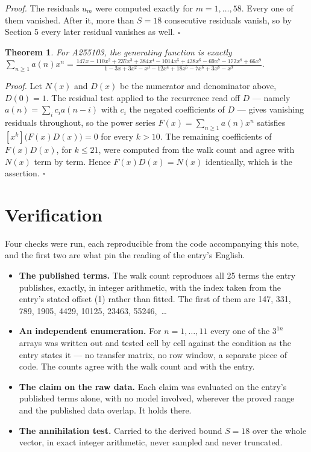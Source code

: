 \documentclass[11pt]{article}
\newtheorem{theorem}{Theorem}
\theoremstyle{definition}
\begin{document}
{\itshape Proof.} The residuals $u_m$ were computed exactly for $m = 1,\dots,58$. Every one of them vanished. After it, more than $S = 18$ consecutive residuals vanish, so by Section 5 every later residual vanishes as well. $\square$

\begin{theorem} For A255103, the generating function is exactly $\sum_{n\ge 1} a(n)x^n = \frac{147x - 110x^{2} + 237x^{3} + 384x^{4} - 1014x^{5} + 438x^{6} - 69x^{7} - 172x^{8} + 66x^{9}}{1 - 3x + 3x^{2} - x^{3} - 12x^{4} + 18x^{5} - 7x^{6} + 3x^{8} - x^{9}}$.\end{theorem}

{\itshape Proof.} Let $N(x)$ and $D(x)$ be the numerator and denominator above, $D(0)=1$. The residual test applied to the recurrence read off $D$ --- namely $a(n) = \sum_i c_i a(n-i)$ with $c_i$ the negated coefficients of $D$ --- gives vanishing residuals throughout, so the power series $F(x)=\sum_{n\ge 1}a(n)x^n$ satisfies $[x^k]\bigl(F(x)D(x)\bigr) = 0$ for every $k > 10$. The remaining coefficients of $F(x)D(x)$, for $k \le 21$, were computed from the walk count and agree with $N(x)$ term by term. Hence $F(x)D(x) = N(x)$ identically, which is the assertion. $\square$

\section{Verification}

Four checks were run, each reproducible from the code accompanying this note, and the first two are what pin the reading of the entry's English.

\begin{itemize}

\item {\bfseries The published terms.} The walk count reproduces all 25 terms the entry publishes, exactly, in integer arithmetic, with the index taken from the entry's stated offset (1) rather than fitted. The first of them are 147, 331, 789, 1905, 4429, 10125, 23463, 55246,~\dots

\item {\bfseries An independent enumeration.} For $n = 1,\dots,11$ every one of the $3^{1n}$ arrays was written out and tested cell by cell against the condition as the entry states it --- no transfer matrix, no row window, a separate piece of code. The counts agree with the walk count and with the entry.

\item {\bfseries The claim on the raw data.} Each claim was evaluated on the entry's published terms alone, with no model involved, wherever the proved range and the published data overlap. It holds there.

\item {\bfseries The annihilation test.} Carried to the derived bound $S = 18$ over the whole vector, in exact integer arithmetic, never sampled and never truncated.

\end{itemize}
\end{document}
